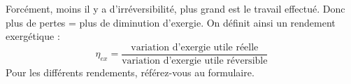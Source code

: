	Forcément, moins il y a d'irréversibilité, plus grand est le travail effectué. Donc 
	plus de pertes = plus de diminution d'exergie. On définit ainsi un rendement exergétique :
	\begin{equation}
	\eta_{ex} = \dfrac{\text{variation d'exergie utile réelle}}{\text{variation d'exergie 
	utile réversible}}
	\end{equation}
	Pour les différents rendements, référez-vous au formulaire.
		
		
		
		
		
		
		
		
		
		
		
		
		
		
		
		
		
		
		
		
		
		
		
		
		
		
		
		
		
		
		
		
		
		
		
		
		
		
		
		
		
		
		
		